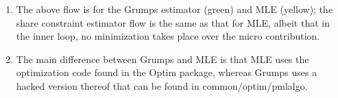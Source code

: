 \documentclass[12pt]{article}
\begin{document}
\begin{enumerate}
    \item The above flow is for the Grumps estimator (green) and MLE (yellow); the share constraint estimator flow is the same as that for MLE, albeit that in the inner loop, no minimization takes place over the micro contribution.
    \item The main difference between Grumps and MLE is that MLE uses the optimization code found in the Optim package, whereas Grumps uses a hacked version thereof that can be found in common/optim/pmlalgo.
\end{enumerate}
\end{document}
